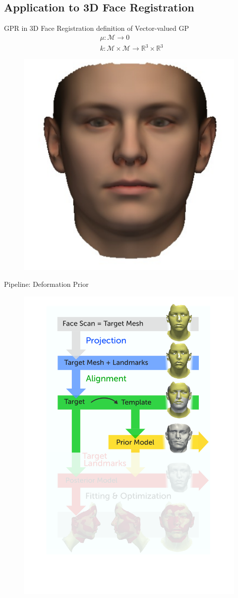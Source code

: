 \documentclass[xcolor=x11names,compress]{beamer}
\begin{document}
\subsection{Application to 3D Face Registration}
\begin{frame}{GPR in 3D Face Registration}
definition of Vector-valued GP
\begin{align*}
    & \mu: \mathcal{M} \rightarrow 0\\
    & k: \mathcal{M} \times \mathcal{M} \rightarrow \mathbb{R}^3 \times \mathbb{R}^3
\end{align*}
 \begin{figure}
        \centering
        \includegraphics[width=.4\textwidth]{../resources/img/mean_msh.pdf}
    \end{figure}
\end{frame}

\begin{frame}{Pipeline: Deformation Prior}
\begin{figure}   
\centering
\includegraphics[width=.6\textwidth]{../resources/figures/pipeline_prior.pdf}
\end{figure}
\end{frame}
\end{document}
